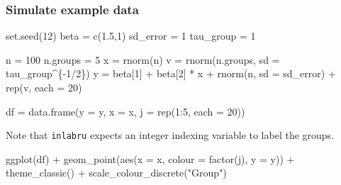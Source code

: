 \documentclass[
  letterpaper,
  DIV=11,
  numbers=noendperiod]{scrartcl}
\newenvironment{Shaded}{\begin{snugshade}}{\end{snugshade}}
\newcommand{\AttributeTok}[1]{\textcolor[rgb]{0.40,0.45,0.13}{#1}}
\newcommand{\DecValTok}[1]{\textcolor[rgb]{0.68,0.00,0.00}{#1}}
\newcommand{\FloatTok}[1]{\textcolor[rgb]{0.68,0.00,0.00}{#1}}
\newcommand{\FunctionTok}[1]{\textcolor[rgb]{0.28,0.35,0.67}{#1}}
\newcommand{\NormalTok}[1]{\textcolor[rgb]{0.00,0.23,0.31}{#1}}
\newcommand{\OtherTok}[1]{\textcolor[rgb]{0.00,0.23,0.31}{#1}}
\newcommand{\SpecialCharTok}[1]{\textcolor[rgb]{0.37,0.37,0.37}{#1}}
\newcommand{\StringTok}[1]{\textcolor[rgb]{0.13,0.47,0.30}{#1}}
\begin{document}
\subsubsection{\texorpdfstring{\textbf{Simulate example
data}}{Simulate example data}}\label{simulate-example-data-1}

\begin{Shaded}
\begin{Highlighting}[]
\FunctionTok{set.seed}\NormalTok{(}\DecValTok{12}\NormalTok{)}
\NormalTok{beta }\OtherTok{=} \FunctionTok{c}\NormalTok{(}\FloatTok{1.5}\NormalTok{,}\DecValTok{1}\NormalTok{)}
\NormalTok{sd\_error }\OtherTok{=} \DecValTok{1}
\NormalTok{tau\_group }\OtherTok{=} \DecValTok{1}

\NormalTok{n }\OtherTok{=} \DecValTok{100}
\NormalTok{n.groups }\OtherTok{=} \DecValTok{5}
\NormalTok{x }\OtherTok{=} \FunctionTok{rnorm}\NormalTok{(n)}
\NormalTok{v }\OtherTok{=} \FunctionTok{rnorm}\NormalTok{(n.groups, }\AttributeTok{sd =}\NormalTok{ tau\_group}\SpecialCharTok{\^{}}\NormalTok{\{}\SpecialCharTok{{-}}\DecValTok{1}\SpecialCharTok{/}\DecValTok{2}\NormalTok{\})}
\NormalTok{y }\OtherTok{=}\NormalTok{ beta[}\DecValTok{1}\NormalTok{] }\SpecialCharTok{+}\NormalTok{ beta[}\DecValTok{2}\NormalTok{] }\SpecialCharTok{*}\NormalTok{ x }\SpecialCharTok{+} \FunctionTok{rnorm}\NormalTok{(n, }\AttributeTok{sd =}\NormalTok{ sd\_error) }\SpecialCharTok{+}
  \FunctionTok{rep}\NormalTok{(v, }\AttributeTok{each =} \DecValTok{20}\NormalTok{)}

\NormalTok{df }\OtherTok{=} \FunctionTok{data.frame}\NormalTok{(}\AttributeTok{y =}\NormalTok{ y, }\AttributeTok{x =}\NormalTok{ x, }\AttributeTok{j =} \FunctionTok{rep}\NormalTok{(}\DecValTok{1}\SpecialCharTok{:}\DecValTok{5}\NormalTok{, }\AttributeTok{each =} \DecValTok{20}\NormalTok{))  }
\end{Highlighting}
\end{Shaded}

Note that \texttt{inlabru} expects an integer indexing variable to label
the groups.

\begin{Shaded}
\begin{Highlighting}[]
\FunctionTok{ggplot}\NormalTok{(df) }\SpecialCharTok{+}
  \FunctionTok{geom\_point}\NormalTok{(}\FunctionTok{aes}\NormalTok{(}\AttributeTok{x =}\NormalTok{ x, }\AttributeTok{colour =} \FunctionTok{factor}\NormalTok{(j), }\AttributeTok{y =}\NormalTok{ y)) }\SpecialCharTok{+}
  \FunctionTok{theme\_classic}\NormalTok{() }\SpecialCharTok{+}
  \FunctionTok{scale\_colour\_discrete}\NormalTok{(}\StringTok{"Group"}\NormalTok{)}
\end{Highlighting}
\end{Shaded}
\end{document}
